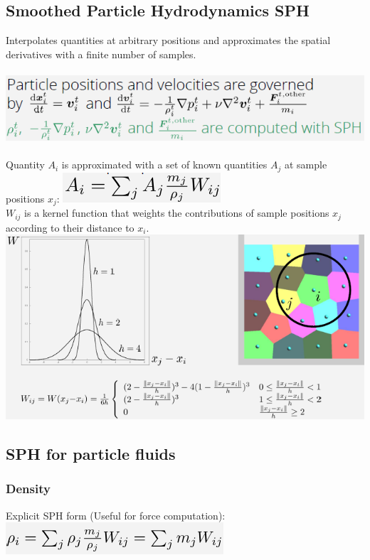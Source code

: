 \documentclass{article}
\begin{document}
\subsection{Smoothed Particle Hydrodynamics SPH}
Interpolates quantities at arbitrary positions and approximates the spatial derivatives with a finite number of samples.\\\\
\includegraphics[scale=0.5]{image95.png}\\\\
Quantity $A_i$ is approximated with a set of known quantities $A_j$ at sample positions $x_j$:
\includegraphics[scale=0.5]{image96.png}\\
$W_{ij}$ is a kernel function that weights the contributions of sample positions $x_j$ according to their distance to $x_i$.\\
\includegraphics[scale=0.5]{image97.png}\\
\subsection{SPH for particle fluids}
\subsubsection{Density}
Explicit SPH form (Useful for force computation):\\
\includegraphics[scale=0.5]{image98.png}\\\\
\end{document}
